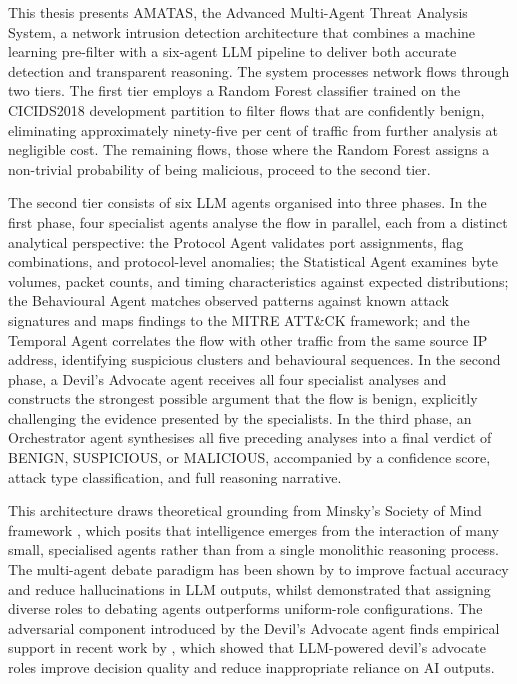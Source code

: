 This thesis presents AMATAS, the Advanced Multi-Agent Threat Analysis System, a network intrusion detection architecture that combines a machine learning pre-filter with a six-agent LLM pipeline to deliver both accurate detection and transparent reasoning. The system processes network flows through two tiers. The first tier employs a Random Forest classifier trained on the CICIDS2018 development partition to filter flows that are confidently benign, eliminating approximately ninety-five per cent of traffic from further analysis at negligible cost. The remaining flows, those where the Random Forest assigns a non-trivial probability of being malicious, proceed to the second tier.

The second tier consists of six LLM agents organised into three phases. In the first phase, four specialist agents analyse the flow in parallel, each from a distinct analytical perspective: the Protocol Agent validates port assignments, flag combinations, and protocol-level anomalies; the Statistical Agent examines byte volumes, packet counts, and timing characteristics against expected distributions; the Behavioural Agent matches observed patterns against known attack signatures and maps findings to the MITRE ATT\&CK framework; and the Temporal Agent correlates the flow with other traffic from the same source IP address, identifying suspicious clusters and behavioural sequences. In the second phase, a Devil's Advocate agent receives all four specialist analyses and constructs the strongest possible argument that the flow is benign, explicitly challenging the evidence presented by the specialists. In the third phase, an Orchestrator agent synthesises all five preceding analyses into a final verdict of BENIGN, SUSPICIOUS, or MALICIOUS, accompanied by a confidence score, attack type classification, and full reasoning narrative.

This architecture draws theoretical grounding from Minsky's Society of Mind framework \autocite{Minsky1986}, which posits that intelligence emerges from the interaction of many small, specialised agents rather than from a single monolithic reasoning process. The multi-agent debate paradigm has been shown by \textcite{Du2023} to improve factual accuracy and reduce hallucinations in LLM outputs, whilst \textcite{Chan2023} demonstrated that assigning diverse roles to debating agents outperforms uniform-role configurations. The adversarial component introduced by the Devil's Advocate agent finds empirical support in recent work by \textcite{Yin2024}, which showed that LLM-powered devil's advocate roles improve decision quality and reduce inappropriate reliance on AI outputs.

